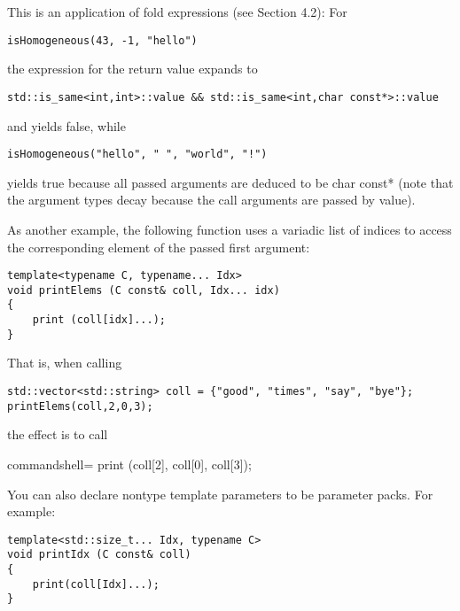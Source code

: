 This is an application of fold expressions (see Section 4.2): For

\begin{lstlisting}[style=styleCXX]
isHomogeneous(43, -1, "hello")
\end{lstlisting}

the expression for the return value expands to

\begin{lstlisting}[style=styleCXX]
std::is_same<int,int>::value && std::is_same<int,char const*>::value
\end{lstlisting}

and yields false, while

\begin{lstlisting}[style=styleCXX]
isHomogeneous("hello", " ", "world", "!")
\end{lstlisting}

yields true because all passed arguments are deduced to be char const* (note that the argument types decay because the call arguments are passed by value).


As another example, the following function uses a variadic list of indices to access the corresponding element of the passed first argument:

\begin{lstlisting}[style=styleCXX]
template<typename C, typename... Idx>
void printElems (C const& coll, Idx... idx)
{
	print (coll[idx]...);
}
\end{lstlisting}

That is, when calling

\begin{lstlisting}[style=styleCXX]
std::vector<std::string> coll = {"good", "times", "say", "bye"};
printElems(coll,2,0,3);
\end{lstlisting}

the effect is to call

\begin{tcblisting}{commandshell={}}
print (coll[2], coll[0], coll[3]);
\end{tcblisting}

You can also declare nontype template parameters to be parameter packs. For example:

\begin{lstlisting}[style=styleCXX]
template<std::size_t... Idx, typename C>
void printIdx (C const& coll)
{
	print(coll[Idx]...);
}
\end{lstlisting}

